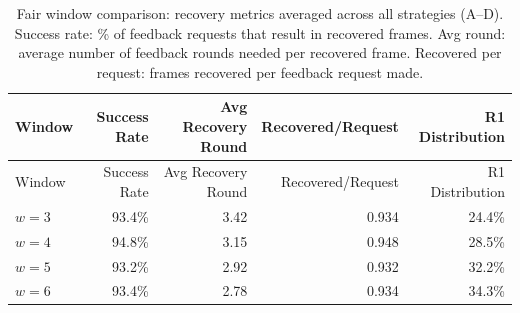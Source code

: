 \begin{center}
\small
\setlength{\tabcolsep}{4.5pt}
\renewcommand{\arraystretch}{1.05}
\begin{longtable}{l r r r r}
\caption{Fair window comparison: recovery metrics averaged across all strategies (A--D). Success rate: \% of feedback requests that result in recovered frames. Avg round: average number of feedback rounds needed per recovered frame. Recovered per request: frames recovered per feedback request made.}\label{tab:recovery-window-comparison}\\
\toprule
Window & Success Rate & Avg Recovery Round & Recovered/Request & R1 Distribution \\
\midrule
\endfirsthead
\toprule
Window & Success Rate & Avg Recovery Round & Recovered/Request & R1 Distribution \\
\midrule
\endhead
\bottomrule
\endfoot
$w=3$ & 93.4\% & 3.42 & 0.934 & 24.4\% \\
$w=4$ & 94.8\% & 3.15 & 0.948 & 28.5\% \\
$w=5$ & 93.2\% & 2.92 & 0.932 & 32.2\% \\
$w=6$ & 93.4\% & 2.78 & 0.934 & 34.3\% \\
\end{longtable}
\end{center}
